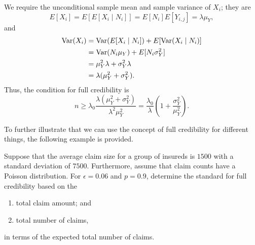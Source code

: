 \documentclass[notoc,notitlepage]{tufte-book}
\begin{document}
\begin{solution}
  We require the unconditional sample mean and sample variance of $X_i$; they
  are
  \begin{equation*}
    E[X_i] = E[E[X_i \mid N_i]] = E[N_i]E[Y_{i, j}] = \lambda \mu_Y,
  \end{equation*}
  and
  \begin{align*}
    \operatorname{Var}(X_i) &= \operatorname{Var}(E[X_i \mid N_i]) + E[\operatorname{Var}(X_i \mid N_i)] \\
              &= \operatorname{Var}(N_i \mu_Y) + E[N_i \sigma^2_Y] \\
              &= \mu_Y^2 \lambda + \sigma^2_Y \lambda \\
              &= \lambda (\mu^2_Y + \sigma^2_Y).
  \end{align*}
  Thus, the condition for full credibility is
  \begin{equation*}
    n \geq \lambda_0 \frac{\lambda(\mu^2_Y + \sigma^2_Y)}{\lambda^2 \mu^2_Y} =
    \frac{\lambda_0}{\lambda} \left( 1 + \frac{\sigma^2_Y}{\mu^2_Y} \right).
  \end{equation*}
\end{solution}

To further illustrate that we can use the concept of full credibility for
different things, the following example is provided.

\begin{eg}\label{eg:full_cred_on_different_basis}
  Suppose that the average claim size for a group of insureds is $1500$ with a
  standard deviation of $7500$. Furthermore, assume that claim counts have a
  Poisson distribution. For $\epsilon = 0.06$ and $p = 0.9$, determine the
  standard for full credibility based on the
  \begin{enumerate}
    \item total claim amount; and
    \item total number of claims,
  \end{enumerate}
  in terms of the expected total number of claims.
\end{eg}
\end{document}
